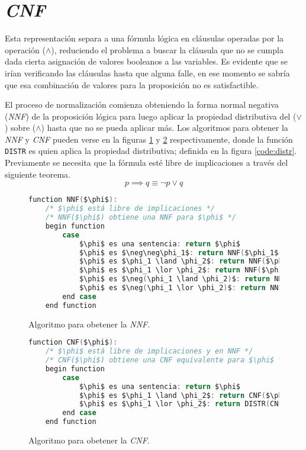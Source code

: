 \section{\textit{CNF}}

Esta representación separa a una fórmula lógica en cláusulas operadas por la operación ($\land$), reduciendo el problema \sat a buscar la cláusula que no se cumpla dada cierta asignación de valores booleanos a las variables. Es evidente que se irían verificando las cláusulas hasta que alguna falle, en ese momento se sabría que esa combinación de valores para la proposición no es satisfactible.

El proceso de normalización comienza obteniendo la forma normal negativa (\textit{NNF}) de la proposición lógica para luego aplicar la propiedad distributiva del ($\lor$) sobre ($\land$) hasta que no se pueda aplicar más. Los algoritmos para obtener la \textit{NNF} y \textit{CNF} pueden verse en la figuras \ref{code:nnf} y \ref{code:cnf} respectivamente\cite{huth2004logic}, donde la función \texttt{DISTR} es quien aplica la propiedad distributiva; definida en la figura \ref{code:distr}. Previamente se necesita que la fórmula esté libre de implicaciones a través del siguiente teorema. \[ p \implies q \equiv \neg p \lor q \]

\begin{figure}
\begin{lstlisting}[language=C,mathescape=true,keywordstyle=\color{black}]
    function NNF($\phi$):
    /* $\phi$ está libre de implicaciones */
    /* NNF($\phi$) obtiene una NNF para $\phi$ */
    begin function
        case
            $\phi$ es una sentencia: return $\phi$
            $\phi$ es $\neg\neg\phi_1$: return NNF($\phi_1$)
            $\phi$ es $\phi_1 \land \phi_2$: return NNF($\phi_1$) $\land$ NNF($\phi_2$)
            $\phi$ es $\phi_1 \lor \phi_2$: return NNF($\phi_1$) $\lor$ NNF($\phi_2$)
            $\phi$ es $\neg(\phi_1 \land \phi_2)$: return NNF($\neg\phi_1$) $\lor$ NNF($\neg\phi_2$)
            $\phi$ es $\neg(\phi_1 \lor \phi_2)$: return NNF($\neg\phi_1$) $\land$ NNF($\neg\phi_2$)
        end case
    end function
\end{lstlisting}
\caption{Algoritmo para obetener la \textit{NNF}.}
\label{code:nnf}
\end{figure}

\begin{figure}
\begin{lstlisting}[language=C,mathescape=true,keywordstyle=\color{black}]
    function CNF($\phi$):
    /* $\phi$ está libre de implicaciones y en NNF */
    /* CNF($\phi$) obtiene una CNF equivalente para $\phi$ */
    begin function
        case
            $\phi$ es una sentencia: return $\phi$
            $\phi$ es $\phi_1 \land \phi_2$: return CNF($\phi_1$) $\land$ CNF($\phi_2$)
            $\phi$ es $\phi_1 \lor \phi_2$: return DISTR(CNF($\phi_1$), CNF($\phi_2$))
        end case
    end function
\end{lstlisting}
\caption{Algoritmo para obetener la \textit{CNF}.}
\label{code:cnf}
\end{figure}

